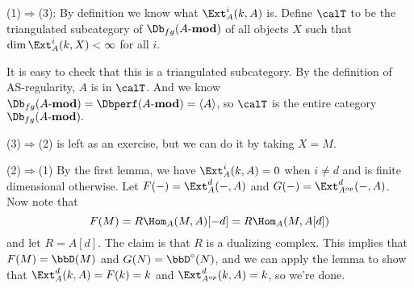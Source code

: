 \documentclass[12pt]{article}
\newcommand*{\Amod}{A\text{-}\mathbf{mod}}
\begin{document}
\begin{prf}[of theorem]
	(1)$\Rightarrow$(3): By definition we know what $\Ext_A^i(k,A)$ is. Define $\calT$ to be the triangulated subcategory of 
	$\Db_{fg}(\Amod)$ of all objects $X$ such that $\dim\Ext_A^i(k,X)<\infty$ for all $i$.

	It is easy to check that this is a triangulated subcategory. By the definition of AS-regularity, $A$ is in $\calT$. And we know $\Db_{fg}(\Amod)=\Dbperf(\Amod)=\langle A\rangle$, so $\calT$ is 
	the entire category $\Db_{fg}(\Amod).$

	\brk

	(3)$\Rightarrow$(2) is left as an exercise, but we can do it by taking $X=M$.

	\brk

	(2)$\Rightarrow$(1) By the first lemma, we have $\Ext_A^i(k,A)=0$ when $i\ne d$ and is finite dimensional otherwise.
	Let $F(-)=\Ext_A^d(-,A)$ and $G(-)=\Ext^d_{A^{op}}(-,A)$. Now note that 
	\[F(M)=R\Hom_A(M,A)[-d]=R\Hom_A(M,A[d])\]
	and let $R=A[d]$. The claim is that $R$ is a dualizing complex. This implies that $F(M)=\bbD(M)$ and $G(N)=\bbD^\circ(N)$,
	and we can apply the lemma to show that $\Ext_A^d(k,A)=F(k)=k$ and $\Ext_{A^{op}}^d(k,A)=k$, so we're done.
\end{prf}	
\end{document}
